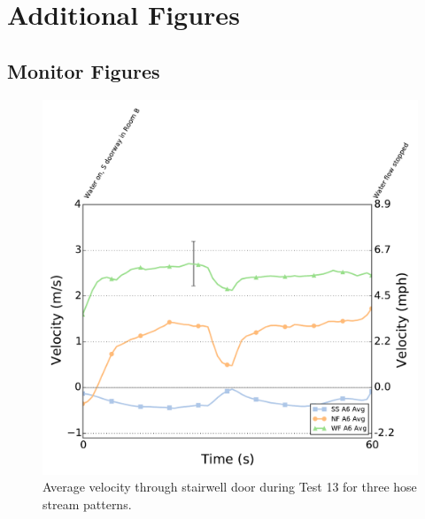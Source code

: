 \documentclass[12pt,oneside]{book}
\begin{document}
\section{Additional Figures}
\label{sec:additional_figs}

\subsection{Monitor Figures}
\label{sec:monitor_figs}

\begin{figure}[!ht]
	\includegraphics[width=\columnwidth]{../Figures/Plots/HOSE_IXXAXX_BDP_A6_stream_avgs}
	\caption{Average velocity through stairwell door during Test 13 for three hose stream patterns.}
	\label{fig:Test_33_BDP_A6_Avg_All}
\end{figure}
\FloatBarrier
\end{document}

